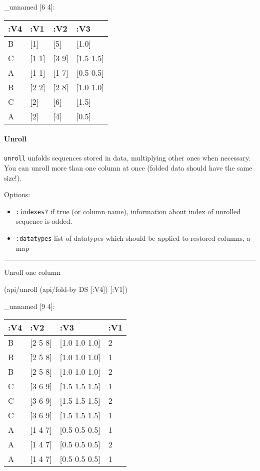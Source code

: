\documentclass[]{article}
\newenvironment{Shaded}{\begin{snugshade}}{\end{snugshade}}
\newcommand{\AttributeTok}[1]{\textcolor[rgb]{0.77,0.63,0.00}{#1}}
\newcommand{\NormalTok}[1]{#1}
\providecommand{\tightlist}{%
  \setlength{\itemsep}{0pt}\setlength{\parskip}{0pt}}
\let\oldparagraph\paragraph
\renewcommand{\paragraph}[1]{\oldparagraph{#1}\mbox{}}
\begin{document}
\_unnamed {[}6 4{]}:

\begin{longtable}[]{@{}llll@{}}
\toprule
:V4 & :V1 & :V2 & :V3\tabularnewline
\midrule
\endhead
B & {[}1{]} & {[}5{]} & {[}1.0{]}\tabularnewline
C & {[}1 1{]} & {[}3 9{]} & {[}1.5 1.5{]}\tabularnewline
A & {[}1 1{]} & {[}1 7{]} & {[}0.5 0.5{]}\tabularnewline
B & {[}2 2{]} & {[}2 8{]} & {[}1.0 1.0{]}\tabularnewline
C & {[}2{]} & {[}6{]} & {[}1.5{]}\tabularnewline
A & {[}2{]} & {[}4{]} & {[}0.5{]}\tabularnewline
\bottomrule
\end{longtable}

\hypertarget{unroll}{%
\paragraph{Unroll}\label{unroll}}

\texttt{unroll} unfolds sequences stored in data, multiplying other ones
when necessary. You can unroll more than one column at once (folded data
should have the same size!).

Options:

\begin{itemize}
\tightlist
\item
  \texttt{:indexes?} if true (or column name), information about index
  of unrolled sequence is added.
\item
  \texttt{:datatypes} list of datatypes which should be applied to
  restored columns, a map
\end{itemize}

\begin{center}\rule{0.5\linewidth}{0.5pt}\end{center}

Unroll one column

\begin{Shaded}
\begin{Highlighting}[]
\NormalTok{(api/unroll (api/fold-by DS [}\AttributeTok{:V4}\NormalTok{]) [}\AttributeTok{:V1}\NormalTok{])}
\end{Highlighting}
\end{Shaded}

\_unnamed {[}9 4{]}:

\begin{longtable}[]{@{}llll@{}}
\toprule
:V4 & :V2 & :V3 & :V1\tabularnewline
\midrule
\endhead
B & {[}2 5 8{]} & {[}1.0 1.0 1.0{]} & 2\tabularnewline
B & {[}2 5 8{]} & {[}1.0 1.0 1.0{]} & 1\tabularnewline
B & {[}2 5 8{]} & {[}1.0 1.0 1.0{]} & 2\tabularnewline
C & {[}3 6 9{]} & {[}1.5 1.5 1.5{]} & 1\tabularnewline
C & {[}3 6 9{]} & {[}1.5 1.5 1.5{]} & 2\tabularnewline
C & {[}3 6 9{]} & {[}1.5 1.5 1.5{]} & 1\tabularnewline
A & {[}1 4 7{]} & {[}0.5 0.5 0.5{]} & 1\tabularnewline
A & {[}1 4 7{]} & {[}0.5 0.5 0.5{]} & 2\tabularnewline
A & {[}1 4 7{]} & {[}0.5 0.5 0.5{]} & 1\tabularnewline
\bottomrule
\end{longtable}
\end{document}
